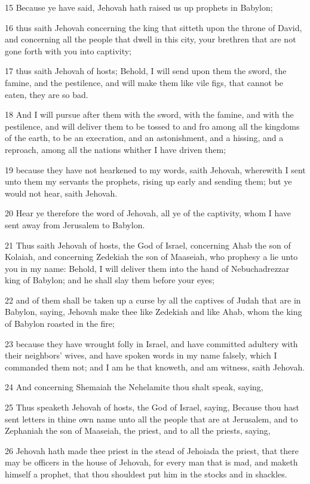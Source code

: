 \par 15 Because ye have said, Jehovah hath raised us up prophets in Babylon;
\par 16 thus saith Jehovah concerning the king that sitteth upon the throne of David, and concerning all the people that dwell in this city, your brethren that are not gone forth with you into captivity;
\par 17 thus saith Jehovah of hosts; Behold, I will send upon them the sword, the famine, and the pestilence, and will make them like vile figs, that cannot be eaten, they are so bad.
\par 18 And I will pursue after them with the sword, with the famine, and with the pestilence, and will deliver them to be tossed to and fro among all the kingdoms of the earth, to be an execration, and an astonishment, and a hissing, and a reproach, among all the nations whither I have driven them;
\par 19 because they have not hearkened to my words, saith Jehovah, wherewith I sent unto them my servants the prophets, rising up early and sending them; but ye would not hear, saith Jehovah.
\par 20 Hear ye therefore the word of Jehovah, all ye of the captivity, whom I have sent away from Jerusalem to Babylon.
\par 21 Thus saith Jehovah of hosts, the God of Israel, concerning Ahab the son of Kolaiah, and concerning Zedekiah the son of Maaseiah, who prophesy a lie unto you in my name: Behold, I will deliver them into the hand of Nebuchadrezzar king of Babylon; and he shall slay them before your eyes;
\par 22 and of them shall be taken up a curse by all the captives of Judah that are in Babylon, saying, Jehovah make thee like Zedekiah and like Ahab, whom the king of Babylon roasted in the fire;
\par 23 because they have wrought folly in Israel, and have committed adultery with their neighbors' wives, and have spoken words in my name falsely, which I commanded them not; and I am he that knoweth, and am witness, saith Jehovah.
\par 24 And concerning Shemaiah the Nehelamite thou shalt speak, saying,
\par 25 Thus speaketh Jehovah of hosts, the God of Israel, saying, Because thou hast sent letters in thine own name unto all the people that are at Jerusalem, and to Zephaniah the son of Maaseiah, the priest, and to all the priests, saying,
\par 26 Jehovah hath made thee priest in the stead of Jehoiada the priest, that there may be officers in the house of Jehovah, for every man that is mad, and maketh himself a prophet, that thou shouldest put him in the stocks and in shackles.
